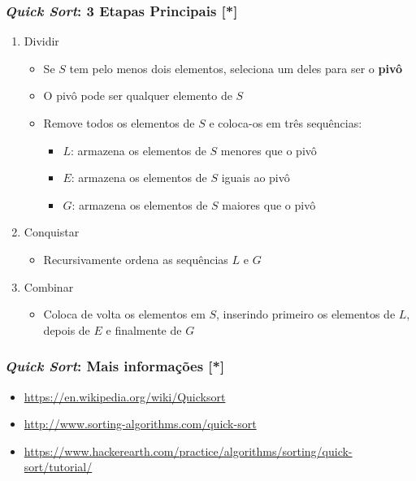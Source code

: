 \documentclass[aspectratio=169]{beamer}
\begin{document}
\begin{frame}\frametitle{\emph{Quick Sort}: 3 Etapas Principais [*]}
\begin{enumerate}
	\item Dividir
	\begin{itemize}	
		\item Se $S$ tem pelo menos dois elementos, seleciona um deles para ser o \textbf{pivô}
		\item O pivô pode ser qualquer elemento de $S$
		\item Remove todos os elementos de $S$ e coloca-os em três sequências:
		\begin{itemize}	
			\item $L$: armazena os elementos de $S$ menores que o pivô
			\item $E$: armazena os elementos de $S$ iguais ao pivô
			\item $G$: armazena os elementos de $S$ maiores que o pivô
		\end{itemize}
	\end{itemize}
	\item Conquistar
	\begin{itemize}	
		\item Recursivamente ordena as sequências $L$ e $G$
	\end{itemize}
	\item Combinar
	\begin{itemize}	
		\item  Coloca de volta os elementos em $S$, inserindo primeiro os elementos de $L$, depois de $E$ e finalmente de $G$
	\end{itemize}
\end{enumerate}
\end{frame}

\begin{frame}[fragile]\frametitle{\emph{Quick Sort}: Mais informações [*]}
\begin{itemize}
	\item \url{https://en.wikipedia.org/wiki/Quicksort}
	\item \url{http://www.sorting-algorithms.com/quick-sort}
	\item \url{https://www.hackerearth.com/practice/algorithms/sorting/quick-sort/tutorial/}
\end{itemize}
\end{frame}
\end{document}
